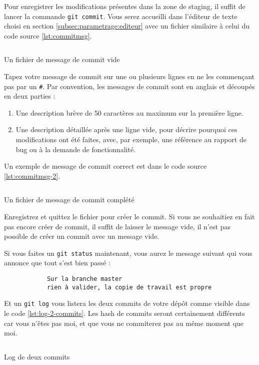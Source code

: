 \documentclass[10pt,a4paper,french]{article}
\renewcommand{\listoflistingscaption}{Liste des codes sources}
\begin{document}
        Pour enregistrer les modifications présentes dans la zone de staging, il suffit de lancer la commande \verb|git commit|. Vous serez accueilli dans l'éditeur de texte choisi en section \ref{subsec:parametrage:editeur} avec un fichier similaire à celui du code source \ref{lst:commitmsg}.

        \begin{listing}[ht]
            \inputminted{sh}{ressources/COMMITMSG-1.txt}
            \caption{Un fichier de message de commit vide}
            \label{lst:commitmsg}
        \end{listing}

        Tapez votre message de commit sur une ou plusieurs lignes en ne les commençant pas par un \verb|#|. Par convention, les messages de commit sont en anglais et découpés en deux parties :
        \begin{enumerate}
            \item Une description brève de 50 caractères au maximum sur la première ligne.
            \item Une description détaillée après une ligne vide, pour décrire pourquoi ces modifications ont été faites, avec, par exemple, une référence au rapport de bug ou à la demande de fonctionnalité.
        \end{enumerate}
        Un exemple de message de commit correct est dans le code source \ref{lst:commitmsg-2}.

        \begin{listing}[ht]
            \inputminted{sh}{ressources/COMMITMSG-2.txt}
            \caption{Un fichier de message de commit complété}
            \label{lst:commitmsg-2}
        \end{listing}

        Enregistrez et quittez le fichier pour créer le commit.
        Si vous ne souhaitiez en fait pas encore créer de commit, il suffit de laisser le message vide, il n'est pas possible de créer un commit avec un message vide.

        Si vous faites un \verb|git status| maintenant, vous aurez le message suivant qui vous annonce que tout s'est bien passé :
        \begin{verbatim}
            Sur la branche master
            rien à valider, la copie de travail est propre
        \end{verbatim}

        Et un \verb|git log| vous listera les deux commits de votre dépôt comme visible dans le code \ref{lst:log-2-commits}. Les hash de commits seront certainement différents car vous n'êtes pas moi, et que vous ne commiterez pas au même moment que moi.

        \begin{listing}[ht]
            \inputminted{text}{ressources/log-2-commits.txt}
            \caption{Log de deux commits}
            \label{lst:log-2-commits}
        \end{listing}

\listoflistings
    \addcontentsline{toc}{section}{\listoflistingscaption}
\end{document}
